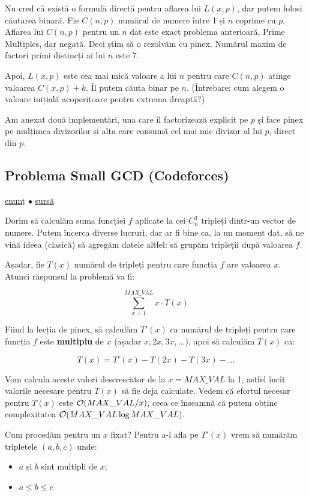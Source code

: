 \documentclass[../main.tex]{subfiles}
\begin{document}
Nu cred că există o formulă directă pentru aflarea lui $L(x, p)$, dar putem folosi căutarea binară. Fie $C(n,p)$ numărul de numere între 1 și $n$ coprime cu $p$. Aflarea lui $C(n,p)$ pentru un $n$ dat este exact problema anterioară, Prime Multiples, dar negată. Deci știm să o rezolvăm cu pinex. Numărul maxim de factori primi distincți ai lui $n$ este 7.

Apoi, $L(x, p)$ este cea mai mică valoare a lui $n$ pentru care $C(n, p)$ atinge valoarea $C(x, p) + k$. Îl putem căuta binar pe $n$. (Întrebare: cum alegem o valoare inițială acoperitoare pentru extrema dreaptă?)

Am anexat două implementări, una care îl factorizează explicit pe $p$ și face pinex pe mulțimea divizorilor și alta care consumă cel mai mic divizor al lui $p$, direct din $p$.


\subsection{Problema Small GCD (Codeforces)}
\label{problem:small-gcd}

\href{https://codeforces.com/contest/1900/problem/D}{enunț}
$\bullet$
\hyperref[code:small-gcd]{sursă}

Dorim să calculăm suma funcției $f$ aplicate la cei $C_n^3$ tripleți dintr-un vector de numere. Putem încerca diverse lucruri, dar ar fi bine ca, la un moment dat, să ne vină ideea (clasică) să agregăm datele altfel: să grupăm tripleții după valoarea $f$.

Așadar, fie $T(x)$ numărul de tripleți pentru care funcția $f$ are valoarea $x$. Atunci răspunsul la problemă va fi:

$$\sum_{x=1}^{MAX\_VAL} x \cdot T(x)$$

Fiind la lecția de pinex, să calculăm $T'(x)$ ca numărul de tripleți pentru care funcția $f$ este \textbf{multiplu} de $x$ (așadar $x, 2x, 3x, \dots$), apoi să calculăm $T(x)$ ca:

$$T(x) = T'(x) - T(2x) - T(3x) - \dots$$

Vom calcula aceste valori descrescător de la $x = MAX\_VAL$ la 1, astfel încît valorile necesare pentru $T(x)$ să fie deja calculate. Vedem că efortul necesar pentru $T(x)$ este $\mathcal{O}(MAX\_VAL / x)$, ceea ce înseamnă că putem obține complexitatea $\mathcal{O}(MAX\_VAL \log MAX\_VAL)$.

Cum procedăm pentru un $x$ fixat? Pentru a-l afla pe $T'(x)$ vrem să numărăm tripletele $(a,b,c)$ unde:

\begin{itemize}
  \item $a$ și $b$ sînt multipli de $x$;
  \item $a \leq b \leq c$
\end{itemize}
\end{document}
